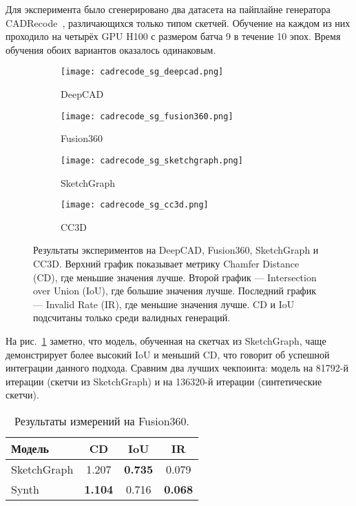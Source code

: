 Для эксперимента было сгенерировано два датасета на пайплайне генератора CADRecode~\cite{rukhovich24_cadrecode}, различающихся только типом скетчей. Обучение на каждом из них проходило на четырёх GPU H100 с размером батча 9 в течение 10 эпох. Время обучения обоих вариантов оказалось одинаковым.

\begin{figure}[h!]
    \centering
    \begin{subfigure}{0.45\linewidth}
        \centering
        \texttt{[image: cadrecode\_sg\_deepcad.png]}
        \caption{DeepCAD}
    \end{subfigure}
    \hfill
    \begin{subfigure}{0.45\linewidth}
        \centering
        \texttt{[image: cadrecode\_sg\_fusion360.png]}
        \caption{Fusion360}
    \end{subfigure}

    \vspace{1em}

    \begin{subfigure}{0.45\linewidth}
        \centering
        \texttt{[image: cadrecode\_sg\_sketchgraph.png]}
        \caption{SketchGraph}
    \end{subfigure}
    \hfill
    \begin{subfigure}{0.45\linewidth}
        \centering
        \texttt{[image: cadrecode\_sg\_cc3d.png]}
        \caption{CC3D}
    \end{subfigure}

    \caption{Результаты экспериментов на DeepCAD, Fusion360, SketchGraph и CC3D.
        Верхний график показывает метрику Chamfer Distance (CD), где меньшие значения лучше.
        Второй график — Intersection over Union (IoU), где большие значения лучше.
        Последний график — Invalid Rate (IR), где меньшие значения лучше.
        CD и IoU подсчитаны только среди валидных генераций.}
    \label{fig:exp5}
\end{figure}

На рис.~\ref{fig:exp5} заметно, что модель, обученная на скетчах из SketchGraph, чаще демонстрирует более высокий IoU и меньший CD, что говорит об успешной интеграции данного подхода.
Сравним два лучших чекпоинта: модель на 81792-й итерации (скетчи из SketchGraph) и на 136320-й итерации (синтетические скетчи).

\begin{table}[h!]
    \centering
    \begin{tabular}{lccc}
        \toprule
        \textbf{Модель} & \textbf{CD}    & \textbf{IoU}   & \textbf{IR}    \\
        \midrule
        SketchGraph     & 1.207          & \textbf{0.735} & 0.079          \\
        Synth           & \textbf{1.104} & 0.716          & \textbf{0.068} \\
        \bottomrule
    \end{tabular}
    \caption{Результаты измерений на Fusion360.}
\end{table}

